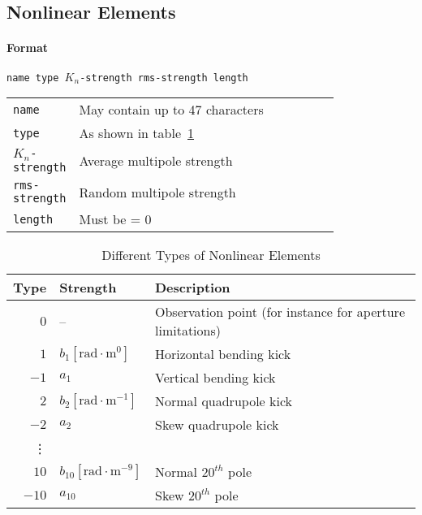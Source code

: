 \subsection{Nonlinear Elements} \label{NonEle}

\paragraph{Format} \texttt{name type $K_{n}$-strength rms-strength length}

\bigskip
\begin{tabular}{@{}lp{0.8\linewidth}}
    \texttt{name} & May contain up to 47 characters \\
    \texttt{type} & As shown in table~\ref{T-NonEle} \\
    \texttt{$K_{n}$-strength} & Average multipole strength \\
    \texttt{rms-strength} & Random multipole strength \\
    \texttt{length} & Must be = 0
\end{tabular}

\begin{table}[h]
    \caption{Different Types of Nonlinear Elements}
    \label{T-NonEle}
    \centering
    \begin{tabular}{|r|l|l|}
        \hline
        \rowcolor{blue!30}
        Type & Strength & Description \\
        \hline
        $0$ & -- & Observation point (for instance for aperture limitations) \\
        \hline
        $1$  & $b_{1} [\mathrm{rad} \cdot \mathrm{m}^{0}]$ & Horizontal bending kick \\
        $-1$ & $a_{1}$ & Vertical bending kick \\
        \hline
        $2$  & $b_{2} [\mathrm{rad} \cdot \mathrm{m}^{-1}]$ & Normal quadrupole kick \\
        $-2$ & $a_{2}$ & Skew quadrupole kick \\
        \hline
        \vdots & & \\
        \hline
        $10$  & $b_{10} [\mathrm{rad} \cdot \mathrm{m}^{-9}]$ & Normal $20^{th}$ pole \\
        $-10$ & $a_{10}$ & Skew $20^{th}$ pole \\
        \hline
    \end{tabular}
\end{table}

